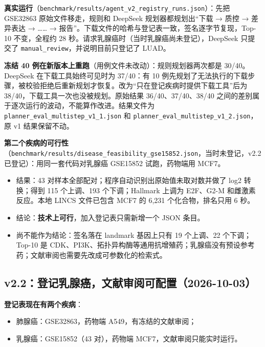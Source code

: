 \documentclass[
  10pt,
]{ctexart}
\providecommand{\tightlist}{%
  \setlength{\itemsep}{0pt}\setlength{\parskip}{0pt}}
\begin{document}
\textbf{真实运行}（\texttt{benchmark/\allowbreak{}results/\allowbreak{}agent\_\allowbreak{}v2\_\allowbreak{}registry\_\allowbreak{}runs.\allowbreak{}json}）：先把
GSE32863 原始文件移走，规则和 DeepSeek 规划器都规划出``下载 → 质控 →
差异表达 → \ldots\ldots{} →
报告''。下载文件的哈希与登记表一致，签名逐字节复现，Top-10 不变，全程约
28 秒。请求乳腺癌时（当时乳腺癌尚未登记），DeepSeek 只提交了
\texttt{manual\_\allowbreak{}review}，并说明目前只登记了 LUAD。

\textbf{冻结 40 例在新版本上重跑}（用例文件未改动）：规则规划器两次都是
30/40。DeepSeek 在下载工具始终可见时为 37/40：有 10
例先规划了无法执行的下载步骤，被校验拒绝后重新规划才恢复。改为``只在登记疾病时提供下载工具''后为
38/40，下载工具一次也没被规划。原始结果 36/40、37/40、38/40
之间的差别属于逐次运行的波动，不能算作改进。结果文件为
\texttt{planner\_\allowbreak{}eval\_\allowbreak{}multistep\_\allowbreak{}v1\_\allowbreak{}1.\allowbreak{}json} 和
\texttt{planner\_\allowbreak{}eval\_\allowbreak{}multistep\_\allowbreak{}v1\_\allowbreak{}2.\allowbreak{}json}，原 v1 结果保留不动。

\textbf{第二个疾病的可行性}（\texttt{benchmark/\allowbreak{}results/\allowbreak{}disease\_\allowbreak{}feasibility\_\allowbreak{}gse15852.\allowbreak{}json}，当时未登记，v2.2
已登记）：用同一套代码对乳腺癌 GSE15852 试跑，药物端用 MCF7。

\begin{itemize}
\tightlist
\item
  结果：43 对样本全部配对；程序自动识别出原始值未取对数并做了 log2
  转换；得到 115 个上调、193 个下调；Hallmark 上调为 E2F、G2-M
  和雌激素反应。本地 LINCS 文件已包含 MCF7 的 6,231 个化合物，排名只用 6
  秒。
\item
  结论：\textbf{技术上可行}，加入登记表只需新增一个 JSON 条目。
\item
  尚不能作为结论：签名落在 landmark 基因上只有 19 个上调、22
  个下调；Top-10 是
  CDK、PI3K、拓扑异构酶等通用抗增殖药；乳腺癌没有预设参考药；文献审阅也需要先改成可参数化的检索式。
\end{itemize}

\subsection{v2.2：登记乳腺癌，文献审阅可配置（2026-10-03）}\label{v22ux767bux8bb0ux4e73ux817aux764cux6587ux732eux5ba1ux9605ux53efux914dux7f6e2026-10-03}

\textbf{登记表现在有两个疾病}：

\begin{itemize}
\tightlist
\item
  肺腺癌：GSE32863，药物端 A549，有冻结的文献审阅；
\item
  乳腺癌：GSE15852（43 对），药物端 MCF7，文献审阅只能实时运行。
\end{itemize}
\end{document}
